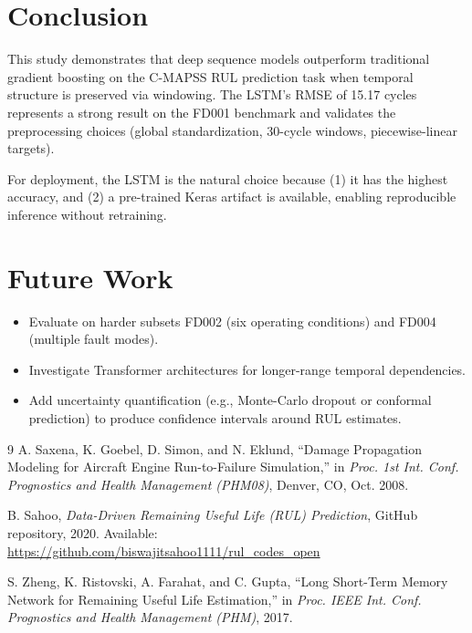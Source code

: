 \documentclass[11pt,a4paper]{article}
\begin{document}
\section{Conclusion}
This study demonstrates that deep sequence models outperform traditional gradient boosting on the C-MAPSS RUL prediction task when temporal structure is preserved via windowing. The LSTM's RMSE of 15.17 cycles represents a strong result on the FD001 benchmark and validates the preprocessing choices (global standardization, 30-cycle windows, piecewise-linear targets).

For deployment, the LSTM is the natural choice because (1) it has the highest accuracy, and (2) a pre-trained Keras artifact is available, enabling reproducible inference without retraining.

\section*{Future Work}
\begin{itemize}
    \item Evaluate on harder subsets FD002 (six operating conditions) and FD004 (multiple fault modes).
    \item Investigate Transformer architectures for longer-range temporal dependencies.
    \item Add uncertainty quantification (e.g., Monte-Carlo dropout or conformal prediction) to produce confidence intervals around RUL estimates.
\end{itemize}

\begin{thebibliography}{9}
A. Saxena, K. Goebel, D. Simon, and N. Eklund, ``Damage Propagation Modeling for Aircraft Engine Run-to-Failure Simulation,'' in \emph{Proc. 1st Int. Conf. Prognostics and Health Management (PHM08)}, Denver, CO, Oct. 2008.

B. Sahoo, \emph{Data-Driven Remaining Useful Life (RUL) Prediction}, GitHub repository, 2020. Available: \url{https://github.com/biswajitsahoo1111/rul_codes_open}

S. Zheng, K. Ristovski, A. Farahat, and C. Gupta, ``Long Short-Term Memory Network for Remaining Useful Life Estimation,'' in \emph{Proc. IEEE Int. Conf. Prognostics and Health Management (PHM)}, 2017.
\end{thebibliography}
\end{document}
